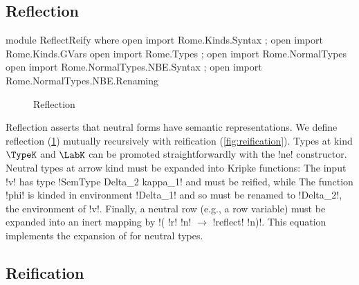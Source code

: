 \subsection{Reflection}
\begin{AgdaAlign}
\begin{code}[hide]
module ReflectReify where
  open import Rome.Kinds.Syntax ; open import Rome.Kinds.GVars 
  open import Rome.Types ; open import Rome.NormalTypes
  open import Rome.NormalTypes.NBE.Syntax ; open import Rome.NormalTypes.NBE.Renaming
\end{code}
\begin{figure}
\caption{Reflection}
\label{fig:reflection}
\end{figure}



Reflection asserts that neutral forms have semantic representations. We define reflection (\cref{fig:reflection}) mutually recursively with reification (\cref{fig:reification}). Types at kind $\TypeK$ and $\LabK$ can be promoted straightforwardly with the !ne! constructor. Neutral types at arrow kind must be expanded into Kripke functions: The input !v! has type !SemType Delta_2 kappa_1! and must be reified, while The function !phi! is kinded in environment !Delta_1! and so must be renamed to !Delta_2!, the environment of !v!. Finally, a neutral row (e.g., a row variable) must be expanded into an inert mapping by !(\! !r! !n! $\to$ !reflect! !n)!. This equation implements the expansion of  for neutral types.

\subsection{Reification}
\label{sec:reification}


\end{AgdaAlign}
